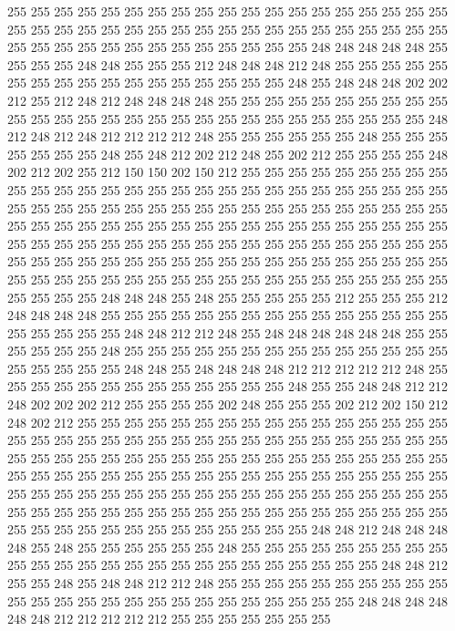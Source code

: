 255 255 255 255 255 255 255 255 255 255 255 255 255 255 255 255 255 255 255 255
255 255 255 255 255 255 255 255 255 255 255 255 255 255 255 255 255 255 255 255
255 255 255 255 255 255 255 255 255 255 255 248 248 248 248 248 255 255 255 255
248 248 255 255 255 212 248 248 248 212 248 255 255 255 255 255 255 255 255 255
255 255 255 255 255 255 255 255 248 255 248 248 248 202 202 212 255 212 248 212
248 248 248 248 255 255 255 255 255 255 255 255 255 255 255 255 255 255 255 255
255 255 255 255 255 255 255 255 255 255 255 255 248 212 248 212 248 212 212 212
212 248 255 255 255 255 255 255 248 255 255 255 255 255 255 255 248 255 248 212
202 212 248 255 202 212 255 255 255 255 248 202 212 202 255 212 150 150 202 150
212 255 255 255 255 255 255 255 255 255 255 255 255 255 255 255 255 255 255 255
255 255 255 255 255 255 255 255 255 255 255 255 255 255 255 255 255 255 255 255
255 255 255 255 255 255 255 255 255 255 255 255 255 255 255 255 255 255 255 255
255 255 255 255 255 255 255 255 255 255 255 255 255 255 255 255 255 255 255 255
255 255 255 255 255 255 255 255 255 255 255 255 255 255 255 255 255 255 255 255
255 255 255 255 255 255 255 255 255 255 255 255 255 255 255 255 255 255 255 255
255 255 255 255 255 255 255 255 248 248 248 255 248 255 255 255 255 255 212 255
255 255 212 248 248 248 248 255 255 255 255 255 255 255 255 255 255 255 255 255
255 255 255 255 255 255 255 248 248 212 212 248 255 248 248 248 248 248 248 255
255 255 255 255 255 248 255 255 255 255 255 255 255 255 255 255 255 255 255 255
255 255 255 255 255 248 248 255 248 248 248 248 212 212 212 212 212 248 255 255
255 255 255 255 255 255 255 255 255 255 255 248 255 255 248 248 212 212 248 202
202 202 212 255 255 255 255 202 248 255 255 255 202 212 202 150 212 248 202 212
255 255 255 255 255 255 255 255 255 255 255 255 255 255 255 255 255 255 255 255
255 255 255 255 255 255 255 255 255 255 255 255 255 255 255 255 255 255 255 255
255 255 255 255 255 255 255 255 255 255 255 255 255 255 255 255 255 255 255 255
255 255 255 255 255 255 255 255 255 255 255 255 255 255 255 255 255 255 255 255
255 255 255 255 255 255 255 255 255 255 255 255 255 255 255 255 255 255 255 255
255 255 255 255 255 255 255 255 255 255 255 255 255 255 255 255 255 255 255 255
255 255 255 255 248 248 212 248 248 248 248 255 248 255 255 255 255 255 255 248
255 255 255 255 255 255 255 255 255 255 255 255 255 255 255 255 255 255 255 255
255 255 255 255 255 248 248 212 255 255 248 255 248 248 212 212 248 255 255 255
255 255 255 255 255 255 255 255 255 255 255 255 255 255 255 255 255 255 255 255
255 255 248 248 248 248 248 248 212 212 212 212 212 255 255 255 255 255 255 255
